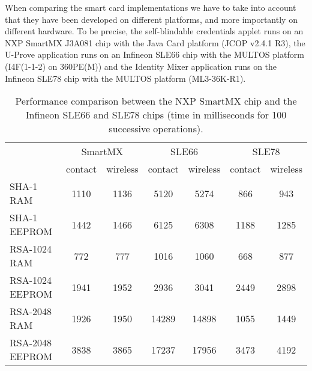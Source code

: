 When comparing the smart card implementations we have to take into account that
they have been developed on different platforms, and more importantly on
different hardware. To be precise, the self-blindable credentials applet runs on
an NXP SmartMX J3A081 chip with the Java Card platform (JCOP v2.4.1 R3), the
U-Prove application runs on an Infineon SLE66 chip with the MULTOS platform
(I4F(1-1-2) on 360PE(M)) and the Identity Mixer application runs on the Infineon
SLE78 chip with the MULTOS platform (ML3-36K-R1).

\begin{table}[t]
  \centering
  \caption{Performance comparison between the NXP SmartMX chip and the Infineon
    SLE66 and SLE78 chips (time in milliseconds for 100 successive operations).}
  \label{tab:comparison}
  \renewcommand{\tabcolsep}{1.25mm}
  \renewcommand{\arraystretch}{1.25}
  \begin{tabular}{l|c|c|c|c|c|c|}
     & \multicolumn{2}{c|}{SmartMX} & \multicolumn{2}{c|}{SLE66} & \multicolumn{2}{c|}{SLE78} \\
     & contact & wireless & contact & wireless & contact & wireless \\\hline
    SHA-1 RAM        & 1110 & 1136 &  5120 &  5274 &  866 &  943 \\\hline
    SHA-1 EEPROM     & 1442 & 1466 &  6125 &  6308 & 1188 & 1285 \\\hline
    RSA-1024 RAM     &  772 &  777 &  1016 &  1060 &  668 &  877 \\\hline
    RSA-1024 EEPROM  & 1941 & 1952 &  2936 &  3041 & 2449 & 2898 \\\hline
    RSA-2048 RAM     & 1926 & 1950 & 14289 & 14898 & 1055 & 1449 \\\hline
    RSA-2048 EEPROM  & 3838 & 3865 & 17237 & 17956 & 3473 & 4192 \\\hline
  \end{tabular}
\end{table}

